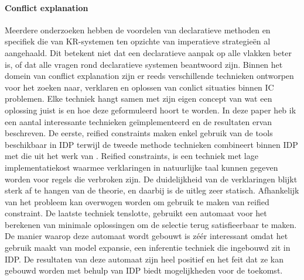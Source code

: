 \paragraph{Conflict explanation}
Meerdere onderzoeken hebben de voordelen van declaratieve methoden \cite{gelle1996interactive} en specifiek die van KR-systemen \cite{de2014predicate} \cite{denecker2008building} \cite{van2016kb} \cite{vlaeminck2009logical} ten opzichte van imperatieve strategie\"{e}n al aangehaald. Dit betekent niet dat een declaratieve aanpak op alle vlakken beter is, of dat alle vragen rond declaratieve systemen beantwoord zijn. Binnen het domein van conflict explanation zijn er reeds verschillende technieken ontworpen voor het zoeken naar, verklaren en oplossen van conlict situaties binnen IC problemen. Elke techniek hangt samen met zijn eigen concept van wat een oplossing juist is en hoe deze geformuleerd hoort te worden. In deze paper heb ik een aantal interessante technieken ge\"{i}mplementeerd en de resultaten ervan beschreven. De eerste, reified constraints maken enkel gebruik van de tools beschikbaar in IDP terwijl de tweede methode technieken combineert binnen IDP met die uit het werk van \citep{amilhastre2002consistency}. Reified constraints, is een techniek met lage implementatiekost waarmee verklaringen in natuurlijke taal kunnen gegeven worden voor regels die verbroken zijn. De duidelijkheid van de verklaringen blijkt sterk af te hangen van de theorie, en daarbij is de uitleg zeer statisch. Afhankelijk van het probleem kan overwogen worden om gebruik te maken van reified constraint. De laatste techniek tenslotte, gebruikt een automaat voor het berekenen van minimale oplossingen om de selectie terug satisfieerbaar te maken. De manier waarop deze automaat wordt gebouwt is z\'{e}\'{e}r interessant omdat het gebruik maakt van model expansie, een inferentie techniek die ingebouwd zit in IDP. De resultaten van deze automaat zijn heel positief en het feit dat ze kan gebouwd worden met behulp van IDP biedt mogelijkheden voor de toekomst. 

